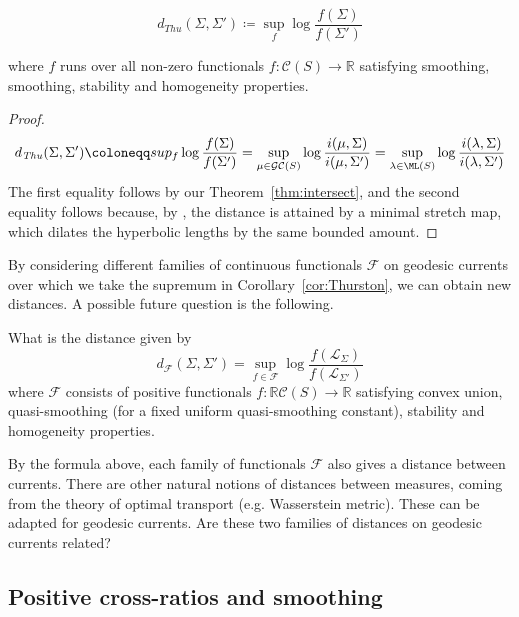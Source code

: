 \begin{corollary}
\[
d_{\mathit{Thu}}(\Sigma,\Sigma') \coloneqq \sup_{f} \log \frac{f(\Sigma)}{f(\Sigma')}
\]

where $f$ runs over all non-zero functionals $f \colon \mathcal{C}(S) \to \mathbb{R}$ satisfying smoothing, smoothing, stability and homogeneity properties.
\label{cor:Thurston}
\end{corollary}
\begin{proof}
\[
d_{\mathit{Thu}}(\Sigma,\Sigma') \coloneqq sup_{f} \log \frac{f(\Sigma)}{f(\Sigma')} = \sup_{\mu \in \mathcal{G}\mathcal{C}(S)} \log \frac{i(\mu,\Sigma)}{i(\mu,\Sigma')} = \sup_{\lambda \in \ML(S)} \log \frac{i(\lambda,\Sigma)}{i(\lambda,\Sigma')}
\]
The first equality follows by our Theorem~\ref{thm:intersect}, and the second equality follows because, by \cite[Theorem~8.5]{Thu98:MinimalStretch}, the distance is attained by a minimal stretch map, which dilates the hyperbolic lengths by the same bounded amount.
\end{proof}

By considering different families of continuous functionals $\mathcal{F}$ on geodesic currents over which we take the supremum in Corollary~\ref{cor:Thurston}, we can obtain new distances.
A possible future question is the following.

\begin{question}

What is the distance given by
 \[
d_{\mathcal{F}}(\Sigma,\Sigma')=\sup_{f \in \mathcal{F}} \log \frac{f(\mathcal{L}_\Sigma)}{f(\mathcal{L}_{\Sigma'})}
\]
where $\mathcal{F}$ consists of positive functionals $f : \mathbb{R}\mathcal{C}(S) \to \mathbb{R}$ satisfying convex union, quasi-smoothing (for a fixed uniform quasi-smoothing constant), stability and homogeneity properties.
 
\end{question}

By the formula above, each family of functionals $\mathcal{F}$ also gives a distance between currents.
There are other natural notions of distances between measures, coming from the theory of optimal transport (e.g. Wasserstein metric).
These can be adapted for geodesic currents. Are these two families of distances on geodesic currents related?

\subsection{Positive cross-ratios and smoothing}

